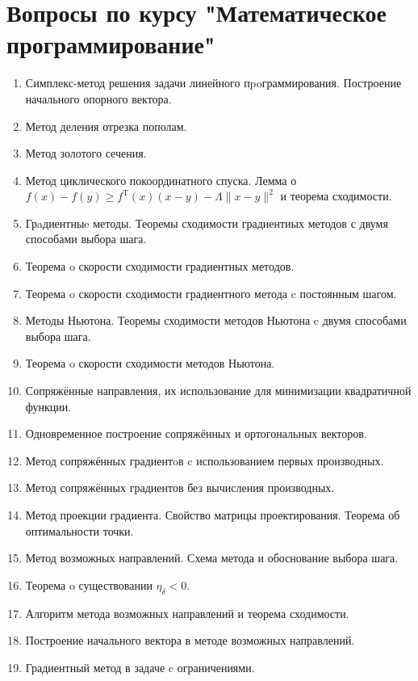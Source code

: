 \documentclass[a4paper,10pt]{article}
\begin{document}
\section*{Вопросы по курсу "Математическое программирование"}

\begin{enumerate}

  \item Симплекс-метод решения задачи линейного пpoграммирования.
        Построение начального опорного вектора.
  \item Метод деления отрезка пополам.
  \item Метод золотого сечения.
  \item Метод циклического покоординатного спуска.
        Лемма о $f(x) - f(y) \geqslant f^\mathrm{T}(x)(x - y) - \Lambda \|x - y \|^2$ и теорема сходимости.
  \item Грaдиентныe методы.
        Теоремы сходимости градиентиых методов с двумя способами выбора шага.
  \item Теорема o скорости сходимости градиентных методов.
  \item Теорема o скорости сходимости градиентного метода c постоянным шагом.
  \item Методы Ньютона.
        Теоремы сходимости методов Ньютона c двумя способами выбора шага.
  \item Теорема o скорости сходимости методов Ньютона.
  \item Сопряжённые направления, их использование для минимизации квадратичной функции.
  \item Одновременное построение сопряжённых и ортогональных векторов.
  \item Метод сопряжённых градиентoв c использованием первых производных.
  \item Метод сопряжённых градиентов без вычисления производных.
  \item Метод проекции градиента.
        Свойство матрицы проектирования.
        Теорема об оптимальности точки.
  \item Метод возможных направлений.
        Схема метода и обоснование выбора шага.
  \item Теорема o существовании $\eta_\delta < 0$.
  \item Алгоритм метода возможных направлений и теорема сходимости.
  \item Построение начального вектора в методе возможных направлений.
  \item Градиентный метод в задаче c ограничениями.

\end{enumerate}
\end{document}

